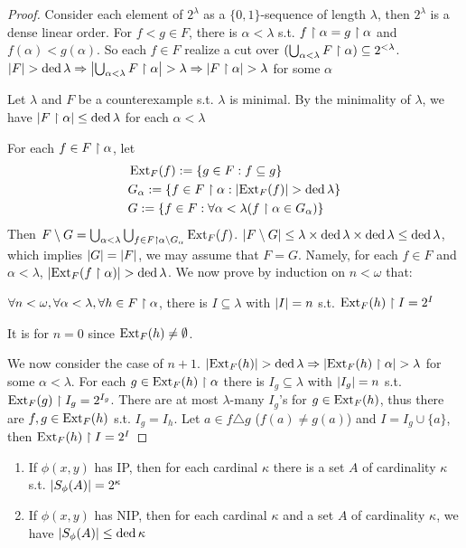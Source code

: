 \documentclass[11pt]{article}
\begin{document}
\begin{proof}
Consider each element of \(2^\lambda\) as a \(\{0,1\}\)-sequence of length \(\lambda\), then \(2^\lambda\) is a dense
linear order. For \(f<g\in F\), there is \(\alpha<\lambda\) s.t. \(f\upharpoonright\alpha=g\upharpoonright\alpha\) and \(f(\alpha)<g(\alpha)\). So
each \(f\in F\) realize a cut
over \((\bigcup_{\alpha<\lambda}F\upharpoonright\alpha)\subseteq 2^{<\lambda}\). \(\abs{F}>\ded\lambda\Rightarrow\abs{\bigcup_{\alpha<\lambda}F\uhr\alpha}>\lambda\Rightarrow\abs{F\uhr\alpha}>\lambda\) for
some \(\alpha\)

Let \(\lambda\) and \(F\) be a counterexample s.t. \(\lambda\) is minimal. By the minimality of \(\lambda\), we
have \(\abs{F\uhr\alpha}\le\ded\lambda\) for each \(\alpha<\lambda\)

For each \(f\in F\upharpoonright\alpha\), let
\begin{align*}
&\Ext_F(f):=\{g\in F:f\subseteq g\}\\
&G_\alpha:=\{f\in F\uhr\alpha:\abs{\Ext_F(f)}>\ded\lambda\}\\
&G:=\{f\in F:\forall\alpha<\lambda(f\uhr\alpha\in G_\alpha)\}
\end{align*}
Then \(F\setminus G=\bigcup_{\alpha<\lambda}\bigcup_{f\in F\upharpoonright\alpha\setminus G_\alpha}\operatorname{Ext}_F(f)\). \(\abs{F\setminus G}\le\lambda\times\ded\lambda\times\ded\lambda\le\ded\lambda\), which
implies \(\abs{G}=\abs{F}\), we may assume that \(F=G\). Namely, for each \(f\in F\)
and \(\alpha<\lambda\), \(\abs{\Ext_F(f\uhr\alpha)}>\ded\lambda\). We now prove by induction on \(n<\omega\) that:
\begin{center}
\(\forall n<\omega,\forall\alpha<\lambda,\forall h\in F\upharpoonright\alpha\), there is \(I\subseteq\lambda\) with \(\abs{I}=n\) s.t. \(\operatorname{Ext}_F(h)\upharpoonright I=2^I\)
\end{center}

It is for \(n=0\) since \(\operatorname{Ext}_F(h)\neq\emptyset\).

We now consider the case of \(n+1\). \(\abs{\Ext_F(h)}>\ded\lambda\Rightarrow\abs{\Ext_F(h)\uhr\alpha}>\lambda\) for
some \(\alpha<\lambda\). For each \(g\in\operatorname{Ext}_F(h)\upharpoonright\alpha\) there is \(I_g\subseteq\lambda\) with \(\abs{I_g}=n\)
s.t. \(\operatorname{Ext}_F(g)\upharpoonright I_g=2^{I_g}\). There are at most \(\lambda\)-many \(I_g\)'s for \(g\in\operatorname{Ext}_F(h)\), thus
there are \(f,g\in\operatorname{Ext}_F(h)\) s.t. \(I_g=I_h\). Let \(a\in f\triangle g\) (\(f(a)\neq g(a)\))
and \(I=I_g\cup\{a\}\), then \(\operatorname{Ext}_F(h)\upharpoonright I=2^I\)
\end{proof}

\begin{proposition}[]
\begin{enumerate}
\item If \(\phi(x,y)\) has IP, then for each cardinal \(\kappa\) there is a set \(A\) of cardinality \(\kappa\) s.t. \(\abs{S_\phi(A)}=2^\kappa\)
\item If \(\phi(x,y)\) has NIP, then for each cardinal \(\kappa\) and a set \(A\) of cardinality \(\kappa\), we have \(\abs{S_\phi(A)}\le\ded\kappa\)
\end{enumerate}
\end{proposition}
\end{document}
